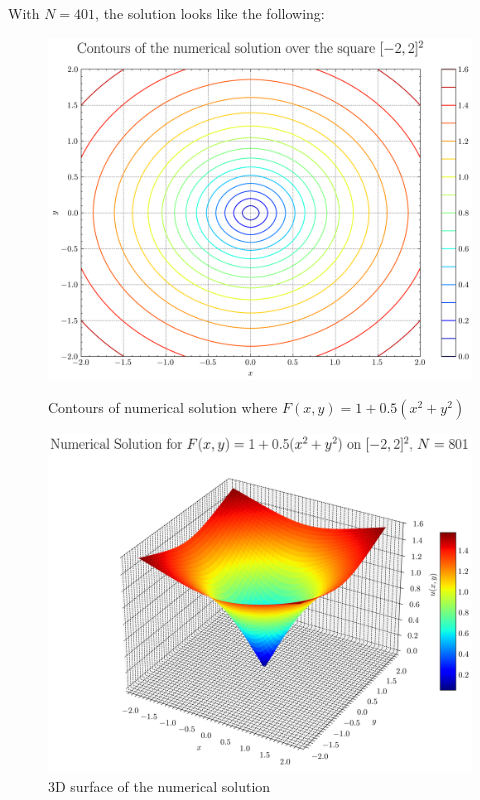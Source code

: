 \documentclass[11pt]{article}
\theoremstyle{definition}
\theoremstyle{remark}
\begin{document}
\noindent With $N=401$, the solution looks like the following:
\begin{figure}[h]
  \centering
  \begin{minipage}{0.45\textwidth}
    \centering
    \includegraphics[width=\linewidth]{plots/contour_plot_arctan.png}
    \caption{Contours of numerical solution where $F(x,y)=1+0.5(x^2+y^2)$}
    \label{fig:contour_arctan}
  \end{minipage}
  \hfill
  \begin{minipage}{0.45\textwidth}
    \centering
    \includegraphics[width=\linewidth]{plots/solution_3d_surface_arctan.png}
    \caption{3D surface of the numerical solution}
    \label{fig:surface_arctan}
  \end{minipage}
\end{figure}
\end{document}
